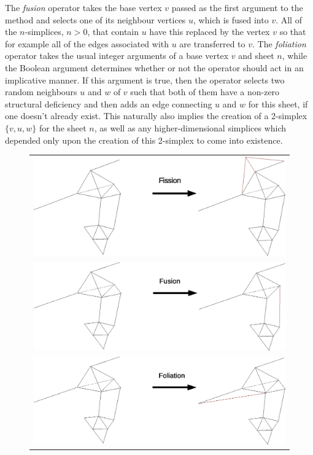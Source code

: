 \documentclass[12pt,letterpaper]{report}
\begin{document}
The \emph{fusion} operator takes the base vertex $v$ passed as the first argument to the method and 
selects one of its neighbour vertices $u$, which is fused into $v$. All of the $n$-simplices, $n>0$, 
that contain $u$ have this replaced by the vertex $v$ so that for example all of the edges associated 
with $u$ are transferred to $v$. The \emph{foliation} operator takes the usual integer arguments of 
a base vertex $v$ and sheet $n$, while the Boolean argument determines whether or not the operator 
should act in an implicative manner. If this argument is true, then the operator selects two random 
neighbours $u$ and $w$ of $v$ such that both of them have a non-zero structural deficiency and then 
adds an edge connecting $u$ and $w$ for this sheet, if one doesn't already exist. This naturally 
also implies the creation of a 2-simplex $\{v,u,w\}$ for the sheet $n$, as well as any higher-dimensional 
simplices which depended only upon the creation of this 2-simplex to come into existence.
\begin{figure}[htp]
\centering
\label{implicative1}
\begin{tabular}{c}
\includegraphics[width=5in]{images/fission.eps} \\
\includegraphics[width=5in]{images/fusion.eps} \\
\includegraphics[width=5in]{images/foliation.eps}
\end{tabular}
\end{figure}
\end{document}

